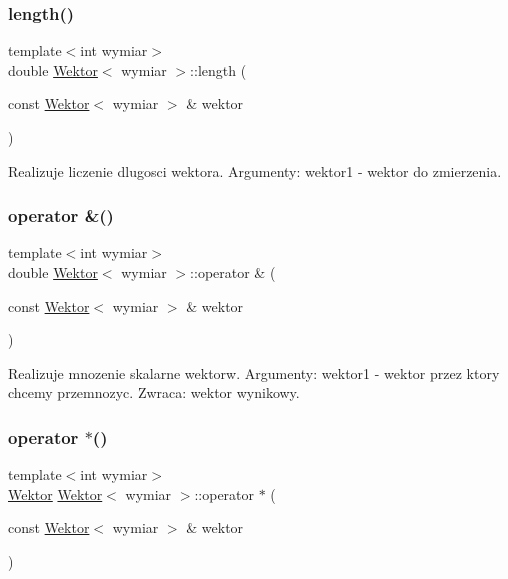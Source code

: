 \subsubsection{\texorpdfstring{length()}{length()}}
{\footnotesize\ttfamily template$<$int wymiar$>$ \\
double \mbox{\hyperlink{class_wektor}{Wektor}}$<$ wymiar $>$\+::length (\begin{DoxyParamCaption}\item[{const \mbox{\hyperlink{class_wektor}{Wektor}}$<$ wymiar $>$ \&}]{wektor }\end{DoxyParamCaption})\hspace{0.3cm}{\ttfamily [inline]}}

Realizuje liczenie dlugosci wektora. Argumenty\+: wektor1 -\/ wektor do zmierzenia. \mbox{\label{class_wektor_a8050f7363a974eb96839b05c0613a97b}} 
\subsubsection{\texorpdfstring{operator \&()}{operator \&()}}
{\footnotesize\ttfamily template$<$int wymiar$>$ \\
double \mbox{\hyperlink{class_wektor}{Wektor}}$<$ wymiar $>$\+::operator \& (\begin{DoxyParamCaption}\item[{const \mbox{\hyperlink{class_wektor}{Wektor}}$<$ wymiar $>$ \&}]{wektor }\end{DoxyParamCaption})\hspace{0.3cm}{\ttfamily [inline]}}

Realizuje mnozenie skalarne wektorw. Argumenty\+: wektor1 -\/ wektor przez ktory chcemy przemnozyc. Zwraca\+: wektor wynikowy. \mbox{\label{class_wektor_a82858892953cabc911195dd99bd06950}} 
\subsubsection{\texorpdfstring{operator $\ast$()}{operator *()}}
{\footnotesize\ttfamily template$<$int wymiar$>$ \\
\mbox{\hyperlink{class_wektor}{Wektor}} \mbox{\hyperlink{class_wektor}{Wektor}}$<$ wymiar $>$\+::operator $\ast$ (\begin{DoxyParamCaption}\item[{const \mbox{\hyperlink{class_wektor}{Wektor}}$<$ wymiar $>$ \&}]{wektor }\end{DoxyParamCaption})\hspace{0.3cm}{\ttfamily [inline]}}

